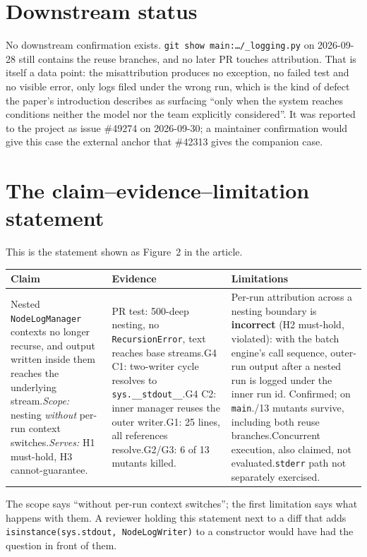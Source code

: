 \documentclass[11pt,a4paper]{article}
\newcommand{\code}[1]{\texttt{#1}}
\begin{document}
\section{Downstream status}
No downstream confirmation exists. \code{git show main:\ldots/\_logging.py} on 2026-09-28 still contains the reuse branches, and no later PR touches attribution. That is itself a data point: the misattribution produces no exception, no failed test and no visible error, only logs filed under the wrong run, which is the kind of defect the paper's introduction describes as surfacing ``only when the system reaches conditions neither the model nor the team explicitly considered''. It was reported to the project as issue \#49274 on 2026-09-30; a maintainer confirmation would give this case the external anchor that \#42313 gives the companion case.

\section{The claim--evidence--limitation statement}
This is the statement shown as Figure~2 in the article.
\begin{center}\small
\begin{tabularx}{\textwidth}{X X X}
\toprule
\textbf{Claim} & \textbf{Evidence} & \textbf{Limitations} \\
\midrule
Nested \code{NodeLogManager} contexts no longer recurse, and output written inside them reaches the underlying stream.\newline\emph{Scope:} nesting \emph{without} per-run context switches.\newline\emph{Serves:} H1 must-hold, H3 cannot-guarantee. &
PR test: 500-deep nesting, no \code{RecursionError}, text reaches base streams.\newline G4 C1: two-writer cycle resolves to \code{sys.\_\_stdout\_\_}.\newline G4 C2: inner manager reuses the outer writer.\newline G1: 25 lines, all references resolve.\newline G2/G3: 6 of 13 mutants killed. &
Per-run attribution across a nesting boundary is \textbf{incorrect} (H2 must-hold, violated): with the batch engine's call sequence, outer-run output after a nested run is logged under the inner run id. Confirmed; on \code{main}.\newline 7/13 mutants survive, including both reuse branches.\newline Concurrent execution, also claimed, not evaluated.\newline \code{stderr} path not separately exercised. \\
\bottomrule
\end{tabularx}
\end{center}
The scope says ``without per-run context switches''; the first limitation says what happens with them. A reviewer holding this statement next to a diff that adds \code{isinstance(sys.stdout, NodeLogWriter)} to a constructor would have had the question in front of them.
\end{document}
